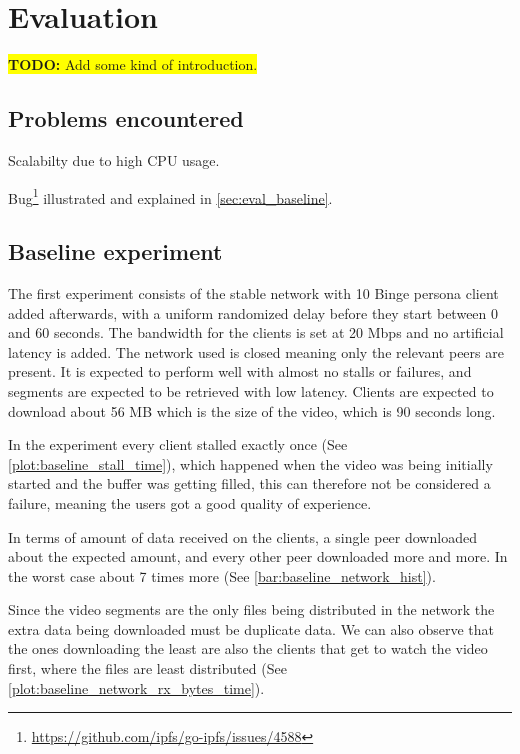 \chapter{Evaluation}
\label{cha:evaluation}

\colorbox{yellow}{\textbf{TODO:} Add some kind of introduction.}

\section{Problems encountered}
Scalabilty due to high CPU usage.

Bug\footnote{\url{https://github.com/ipfs/go-ipfs/issues/4588}} illustrated and explained in \autoref{sec:eval_baseline}.


\section{Baseline experiment}
\label{sec:eval_baseline}
The first experiment consists of the stable network with 10 Binge persona client added afterwards, with a uniform randomized delay before they start between 0 and 60 seconds. The bandwidth for the clients is set at 20 \ac{Mbps} and no artificial latency is added. The network used is closed meaning only the relevant peers are present. It is expected to perform well with almost no stalls or failures, and segments are expected to be retrieved with low latency. Clients are expected to download about 56 \ac{MB} which is the size of the video, which is 90 seconds long.

In the experiment every client stalled exactly once (See \autoref{plot:baseline_stall_time}), which happened when the video was being initially started and the buffer was getting filled, this can therefore not be considered a failure, meaning the users got a good quality of experience.



In terms of amount of data received on the clients, a single peer downloaded about the expected amount, and every other peer downloaded more and more. In the worst case about 7 times more (See \autoref{bar:baseline_network_hist}).



Since the video segments are the only files being distributed in the network the extra data being downloaded must be duplicate data. We can also observe that the ones downloading the least are also the clients that get to watch the video first, where the files are least distributed (See \autoref{plot:baseline_network_rx_bytes_time}).

